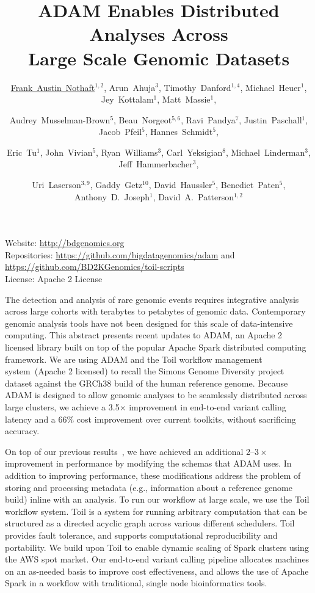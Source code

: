 \documentclass[10pt,oneside]{article}
\title{ADAM Enables Distributed Analyses Across \\ Large Scale Genomic Datasets}
\author{\small \underline{Frank~Austin~Nothaft}$^{1,2}$,
Arun~Ahuja$^3$, Timothy~Danford$^{1,4}$, Michael~Heuer$^1$,
Jey~Kottalam$^1$, Matt~Massie$^1$, \and
\small Audrey~Musselman-Brown$^5$, Beau~Norgeot$^{5,6}$, Ravi~Pandya$^7$,
Justin~Paschall$^1$, Jacob~Pfeil$^5$, Hannes~Schmidt$^5$,
\and \small Eric~Tu$^1$, John~Vivian$^5$,
Ryan~Williams$^3$, Carl~Yeksigian$^8$, Michael~Linderman$^3$, Jeff~Hammerbacher$^3$,
\and \small Uri~Laserson$^{3,9}$, Gaddy~Getz$^{10}$, David~Haussler$^5$, Benedict~Paten$^5$, Anthony~D.~Joseph$^1$,
David~A.~Patterson$^{1,2}$}
\date{}
\begin{document}

\renewcommand{\thefootnote}{\fnsymbol{footnote}}


\maketitle

\vspace{-0.25in}
\noindent
{\small
Website: \url{http://bdgenomics.org} \\
Repositories: \url{https://github.com/bigdatagenomics/adam} and \url{https://github.com/BD2KGenomics/toil-scripts} \\
License: Apache 2 License \\
}

The detection and analysis of rare genomic events requires integrative analysis
across large cohorts with terabytes to petabytes of genomic data. Contemporary
genomic analysis tools have not been designed for this scale of data-intensive
computing. This abstract presents recent updates to ADAM, an Apache 2 licensed
library built on top of the popular Apache Spark distributed computing framework.
We are using ADAM and the Toil workflow management system~(Apache 2 licensed) to
recall the Simons Genome Diversity project dataset against the GRCh38 build of the
human reference genome. Because ADAM is designed to allow genomic analyses to be
seamlessly distributed across large clusters, we achieve a 3.5$\times$ improvement
in end-to-end variant calling latency and a 66\% cost improvement over current toolkits,
without sacrificing accuracy.

On top of our previous results~\cite{nothaft15},
we have achieved an additional 2--$3\times$ improvement in performance by modifying
the schemas that ADAM uses. In addition to improving performance, these modifications
address the problem of storing and processing metadata (e.g., information about a
reference genome build) inline with an analysis. To run our workflow at large scale,
we use the Toil workflow system. Toil is a system for running arbitrary computation that
can be structured as a directed acyclic graph across various different schedulers. Toil
provides fault tolerance, and supports computational reproducibility and portability.
We build upon Toil to enable dynamic scaling of Spark clusters using the AWS spot market.
Our end-to-end variant calling pipeline allocates machines on an as-needed basis to improve
cost effectiveness, and allows the use of Apache Spark in a workflow with traditional, single
node bioinformatics tools.



\end{document}
